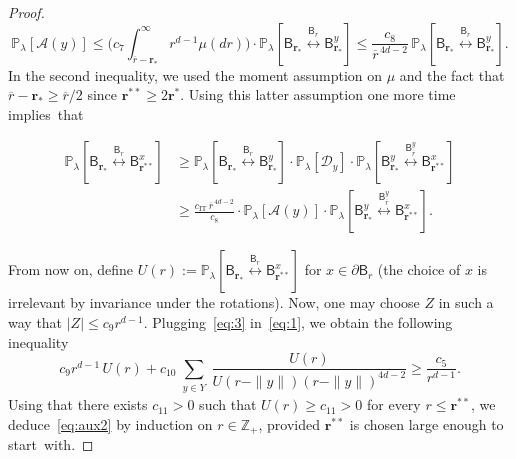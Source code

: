 \documentclass[10pt]{amsart}
\theoremstyle{definition}\newtheorem{defi}[theo]{Definition}\newtheorem{rema}[theo]{Remark}\newtheorem{exam}[theo]{Example}\newtheorem{exem}[theo]{Example}\newtheorem{nota}[theo]{Notation}
\newcommand{\rbf}{\mathbf{r}}
\DeclareMathOperator{\IT}{IT}
\DeclareMathOperator{\Fkg}{(FKG)}
\begin{document}
\begin{proof}
\[
{\mathbb P}_\lambda[{\mathcal A}(y)]\le \Big(c_7\int_{\overline r-{\rbf_*}}^\infty r^{d-1}\mu(dr)\Big)\cdot{\mathbb P}_\lambda\left[\mathsf B_{\mathbf r_*} \stackrel{\mathsf B_r}{\longleftrightarrow} \mathsf B_{\rbf_*}^{y}\right]\le \frac{c_8}{\overline r^{\,4d-2}}\,{\mathbb P}_\lambda\left[\mathsf B_{\mathbf r_*} \stackrel{\mathsf B_r}{\longleftrightarrow} \mathsf B_{\rbf_*}^{y}\right].
\]
In the second inequality, we used the moment assumption on $\mu$ and the fact that $\overline r-{\rbf_*}\ge \overline r/2$ since ${\rbf^{**}}\ge2{\rbf^*}$. Using this latter assumption one more time implies~that

\begin{equation}\label{eq:3}
\begin{aligned}
{\mathbb P}_\lambda\left[\mathsf B_{\mathbf r_*} \stackrel{\mathsf B_r}{\longleftrightarrow} \mathsf B_{{\rbf^{**}}}^x\right]&\stackrel{\Fkg}\ge {\mathbb P}_\lambda\left[\mathsf B_{\mathbf r_*} \stackrel{\mathsf B_r}{\longleftrightarrow} \mathsf B_{\rbf_*}^{y}\right]\cdot {\mathbb P}_\lambda[\mathcal D_y] \cdot {\mathbb P}_\lambda\left[\mathsf B^y_{\mathbf r_*} \stackrel{\mathsf B_{\overline r}^y}{\longleftrightarrow} \mathsf B_{{\rbf^{**}}}^x\right]\\
&\stackrel{\phantom{\Fkg}}\ge \frac{{c_{\IT}}\, \overline r^{\,4d-2}}{c_8}\cdot{\mathbb P}_\lambda[{\mathcal A}(y)]\cdot {\mathbb P}_\lambda\left[\mathsf B^y_{\mathbf r_*} \stackrel{\mathsf B_{\overline r}^y}{\longleftrightarrow} \mathsf B_{\rbf^{**}}^x\right].
\end{aligned}
\end{equation}

From now on, define $U(r):= {\mathbb P}_\lambda [\mathsf B_{\mathbf r_*} \stackrel{\mathsf B_r}{\longleftrightarrow} \mathsf B_{\rbf^{**}}^x]$ for $x\in\partial\mathsf B_r$ (the choice of $x$ is irrelevant by invariance under the rotations). Now, one may choose $Z$ in such a way that $|Z|\le c_{9}r^{d-1}$. Plugging~\eqref{eq:3} in~\eqref{eq:1}, we obtain the following inequality
\[
c_{9}r^{d-1}\,U(r)+c_{10}\sum_{\substack{y\in Y}}\frac{U(r)}{U(r-\|y\|)(r-\|y\|)^{4d-2}}\ge \frac{c_5}{r^{d-1}}.
\]
Using that there exists $c_{11}>0$ such that $U(r)\ge c_{11}>0$ for every $r\leq {\rbf^{**}}$, we deduce~\eqref{eq:aux2} by induction on $r\in\mathbb Z_+$, provided ${\rbf^{**}}$ is chosen large enough to start~with.
\end{proof}
\end{document}
